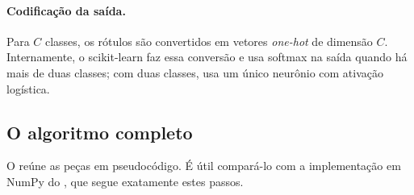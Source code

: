 \paragraph{Codificação da saída.} Para $C$ classes, os rótulos são convertidos em vetores
\emph{one-hot} de dimensão $C$. Internamente, o scikit-learn faz essa conversão e usa softmax na
saída quando há mais de duas classes; com duas classes, usa um único neurônio com ativação
logística.

\subsection{O algoritmo completo}

O  reúne as peças em pseudocódigo. É útil compará-lo com a implementação
em NumPy do , que segue exatamente estes passos.

